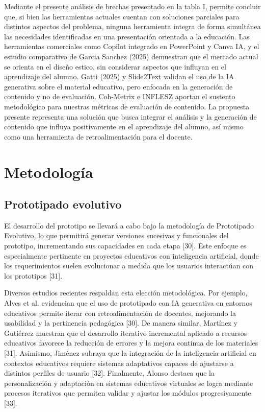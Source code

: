 \documentclass[11pt]{article}
\begin{document}
Mediante el presente análisis de brechas presentado en la tabla I, permite concluir que, si bien las herramientas actuales cuentan con soluciones parciales para distintos aspectos del problema, ninguna herramienta integra de forma simultánea las necesidades identificadas en una presentación orientada a la educación. Las herramientas comerciales como Copilot integrado en PowerPoint y Canva IA, y el estudio comparativo de Garcia Sanchez (2025) demuestran que el mercado actual se orienta en el diseño estico, sin considerar aspectos que influyan en el aprendizaje del alumno. Gatti (2025) y Slide2Text validan el uso de la IA generativa sobre el material educativo, pero enfocada en la generación de contenido y no de evaluación. Coh-Metrix e INFLESZ aportan el sustento metodológico para nuestras métricas de evaluación de contenido. La propuesta presente representa una solución que busca integrar el análisis y la generación de contenido que influya positivamente en el aprendizaje del alumno, así mismo como una herramienta de retroalimentación para el docente.


\newpage
\section*{Metodología}
\subsection*{Prototipado evolutivo}

El desarrollo del prototipo se llevará a cabo bajo la metodología de Prototipado Evolutivo, lo que permitirá generar versiones sucesivas y funcionales del prototipo, incrementando sus capacidades en cada etapa [30]. Este enfoque es especialmente pertinente en proyectos educativos con inteligencia artificial, donde los requerimientos suelen evolucionar a medida que los usuarios interactúan con los prototipos [31].

Diversos estudios recientes respaldan esta elección metodológica. Por ejemplo, Alves et al. evidencian que el uso de prototipado con IA generativa en entornos educativos permite iterar con retroalimentación de docentes, mejorando la usabilidad y la pertinencia pedagógica [30]. De manera similar, Martínez y Gutiérrez muestran que el desarrollo iterativo incremental aplicado a recursos educativos favorece la reducción de errores y la mejora continua de los materiales [31]. Asimismo, Jiménez subraya que la integración de la inteligencia artificial en contextos educativos requiere sistemas adaptativos capaces de ajustarse a distintos perfiles de usuario [32]. Finalmente, Alonso destaca que la personalización y adaptación en sistemas educativos virtuales se logra mediante procesos iterativos que permiten validar y ajustar los módulos progresivamente [33].
\end{document}
